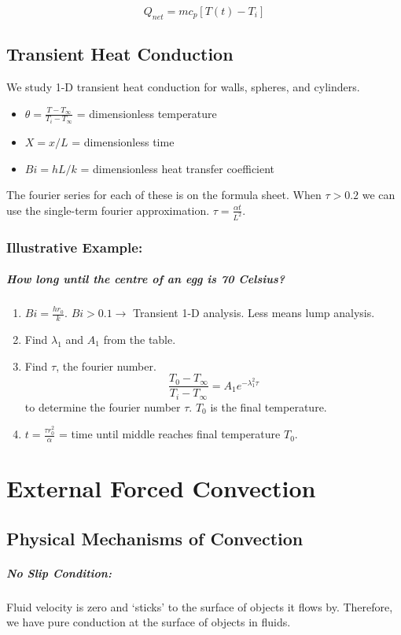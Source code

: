 \documentclass[a4paper,12pt]{report}
\begin{document}
$$Q_{net} = mc_p[T(t) - T_i]$$

\section{Transient Heat Conduction}
We study 1-D transient heat conduction for walls, spheres, and cylinders.
\begin{itemize}
\item $\theta = \frac{T - T_\infty}{T_i-T_\infty}$ = dimensionless temperature
\item $X = x/L$ = dimensionless time
\item $Bi = hL/k$ = dimensionless heat transfer coefficient
\end{itemize}

The fourier series for each of these is on the formula sheet. When $\tau > 0.2$ we can use the single-term fourier approximation. 
$\tau = \frac{\alpha t}{L^2}$.
\subsection{Illustrative Example: }
\paragraph{How long until the centre of an egg is 70 Celsius? }
\begin{enumerate}
\item $Bi = \frac{hr_0}{k}$. $Bi > 0.1 \to $ Transient 1-D analysis. Less means lump analysis. 
\item Find $\lambda_1$ and $A_1$ from the table.
\item Find $\tau$, the fourier number. $$\frac{T_0-T_\infty}{T_i - T_\infty} = A_1 e^{-\lambda_1^2 \tau}$$ to determine the fourier number $\tau$. 
$T_0$ is the final temperature. 
\item $t = \frac{\tau r_0^2}{\alpha}$ = time until middle reaches final temperature $T_0$. 
\end{enumerate}


\chapter{External Forced Convection}
\section{Physical Mechanisms of Convection}
\paragraph{No Slip Condition: } Fluid velocity is zero and `sticks' to the surface of objects it flows by. Therefore, we have pure conduction 
at the surface of objects in fluids. 
\end{document}
